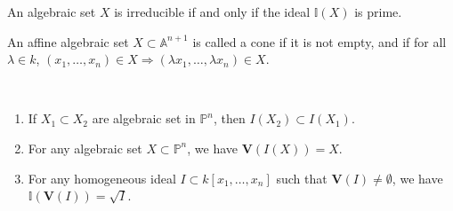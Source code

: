 \documentclass[crop=false,class=book,oneside]{standalone}
\begin{document}
                \begin{theorem}
                    An algebraic set $X$ is irreducible
                    if and only if the ideal $\mathbb{I}(X)$ is prime.
                \end{theorem}
                \begin{definition}
                    An affine algebraic set $X\subset \mathbb{A}^{n+1}$
                    is called a cone if it is not empty, and if for all
                    $\lambda\in{k}$,
                    $(x_1,\hdots, x_n)%
                     \in{X}\Rightarrow(\lambda{x_{1}},\hdots,\lambda{x_{n}})%
                     \in{X}$.
                \end{definition}
                \begin{theorem}
                    \
                    \begin{enumerate}
                        \item If $X_1\subset X_2$ are algebraic
                              set in $\mathbb{P}^{n}$,
                              then $I(X_{2})\subset{I}(X_{1})$.
                        \item For any algebraic set
                              $X\subset\mathbb{P}^{n}$, we have
                              $\mathbf{V}(I(X))=X$.
                        \item For any homogeneous ideal
                              $I\subset{k}[x_{1},\hdots,x_{n}]$ such
                              that $\mathbf{V}(I)\ne\emptyset$,
                              we have
                              $\mathbb{I}(\mathbf{V}(I))=\sqrt{I}$.
                    \end{enumerate}
                \end{theorem}
\end{document}
